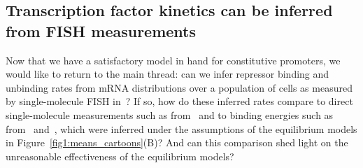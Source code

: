 \subsection{Transcription factor kinetics can be inferred from FISH
measurements}\label{sec:rep_kinetics_inference}

Now that we have a satisfactory model in hand for constitutive promoters, we
would like to return to the main thread: can we infer repressor binding and
unbinding rates from mRNA distributions over a population of cells as measured
by single-molecule FISH in~\cite{Jones2014}? If so, how do these inferred rates
compare to direct single-molecule measurements such as from~\cite{Hammar2014}
and to binding energies such as from~\cite{Garcia2011a}
and~\cite{Razo-Mejia2018}, which were inferred under the assumptions of the
equilibrium models in Figure~\ref{fig1:means_cartoons}(B)? And can this
comparison shed light on the unreasonable effectiveness of the equilibrium
models?

